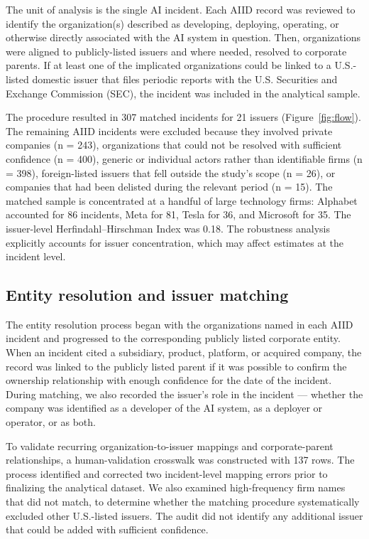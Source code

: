 \documentclass[utf8]{FrontiersinHarvard}
\begin{document}
The unit of analysis is the single AI incident. Each AIID record was reviewed to identify the organization(s) described as developing, deploying, operating, or otherwise directly associated with the AI system in question. Then, organizations were aligned to publicly-listed issuers and where needed, resolved to corporate parents. If at least one of the implicated organizations could be linked to a U.S.-listed domestic issuer that files periodic reports with the U.S. Securities and Exchange Commission (SEC), the incident was included in the analytical sample.

The procedure resulted in 307 matched incidents for 21 issuers (Figure~\ref{fig:flow}). The remaining AIID incidents were excluded because they involved private companies (n = 243), organizations that could not be resolved with sufficient confidence (n = 400), generic or individual actors rather than identifiable firms (n = 398), foreign-listed issuers that fell outside the study's scope (n = 26), or companies that had been delisted during the relevant period (n = 15). The matched sample is concentrated at a handful of large technology firms: Alphabet accounted for 86 incidents, Meta for 81, Tesla for 36, and Microsoft for 35. The issuer-level Herfindahl--Hirschman Index was 0.18. The robustness analysis explicitly accounts for issuer concentration, which may affect estimates at the incident level.

\subsection{Entity resolution and issuer matching}
The entity resolution process began with the organizations named in each AIID incident and progressed to the corresponding publicly listed corporate entity. When an incident cited a subsidiary, product, platform, or acquired company, the record was linked to the publicly listed parent if it was possible to confirm the ownership relationship with enough confidence for the date of the incident. During matching, we also recorded the issuer's role in the incident --- whether the company was identified as a developer of the AI system, as a deployer or operator, or as both.

To validate recurring organization-to-issuer mappings and corporate-parent relationships, a human-validation crosswalk was constructed with 137 rows. The process identified and corrected two incident-level mapping errors prior to finalizing the analytical dataset. We also examined high-frequency firm names that did not match, to determine whether the matching procedure systematically excluded other U.S.-listed issuers. The audit did not identify any additional issuer that could be added with sufficient confidence.
\end{document}
